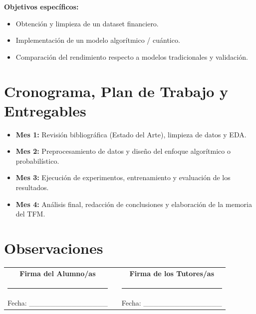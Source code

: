 \documentclass[spanish,a4paper,12pt]{article}
\begin{document}
\textbf{Objetivos específicos:}
\begin{itemize}
    \item Obtención y limpieza de un dataset financiero.
    \item Implementación de un modelo algorítmico / cuántico.
    \item Comparación del rendimiento respecto a modelos tradicionales y validación.
\end{itemize}

\section*{Cronograma, Plan de Trabajo y Entregables}
\begin{itemize}
    \item \textbf{Mes 1:} Revisión bibliográfica (Estado del Arte), limpieza de datos y EDA.
    \item \textbf{Mes 2:} Preprocesamiento de datos y diseño del enfoque algorítmico o probabilístico.
    \item \textbf{Mes 3:} Ejecución de experimentos, entrenamiento y evaluación de los resultados.
    \item \textbf{Mes 4:} Análisis final, redacción de conclusiones y elaboración de la memoria del TFM.
\end{itemize}

\section*{Observaciones}

\vspace{1.5cm}
\begin{center}
\begin{tabular}{ccc}
\textbf{Firma del Alumno/as} & \hspace{2cm} & \textbf{Firma de los Tutores/as} \\[2cm]
\rule{5cm}{0.4pt} & & \rule{5cm}{0.4pt} \\
Fecha: \_\_\_\_\_\_\_\_\_\_\_\_\_\_\_ & & Fecha: \_\_\_\_\_\_\_\_\_\_\_\_\_\_\_
\end{tabular}
\end{center}
\end{document}
